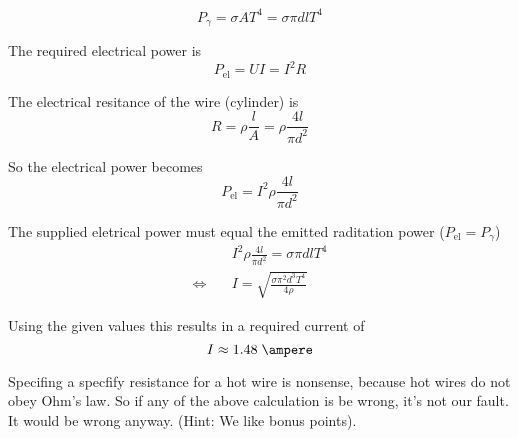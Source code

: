 \documentclass[a4paper,german,12pt,smallheadings]{scrartcl}
\begin{document}
\begin{enumerate}[a)]
    \begin{equation*}
      P_\gamma = \sigma A T^4 = \sigma \pi d l T^4
    \end{equation*}

    The required electrical power is
    \begin{equation*}
      P_\text{el} = UI = I^2R
    \end{equation*}

    The electrical resitance of the wire (cylinder) is
    \begin{equation*}
      R = \rho \frac{l}{A} = \rho \frac{4l}{\pi d^2}
    \end{equation*}

    So the electrical power becomes
    \begin{equation*}
      P_\text{el} = I^2 \rho \frac{4l}{\pi d^2}
    \end{equation*}

    The supplied eletrical power must equal the emitted raditation power ($P_\text{el} = P_\gamma$)
    \begin{align*}
      &\quad I^2 \rho \frac{4l}{\pi d^2} = \sigma \pi d l T^4 \\
      \Leftrightarrow&\quad I = \sqrt{\frac{\sigma \pi^2 d^3 T^4}{4 \rho}}
    \end{align*}

    Using the given values this results in a required current of
    \begin{equation*}
      I \approx 1.48 \; \ampere
    \end{equation*}

    Specifing a specfify resistance for a hot wire is nonsense, because hot
    wires do not obey Ohm's law. So if any of the above calculation is be
    wrong, it's not our fault. It would be wrong anyway. (Hint: We like bonus
    points).
\end{enumerate}
\end{document}
